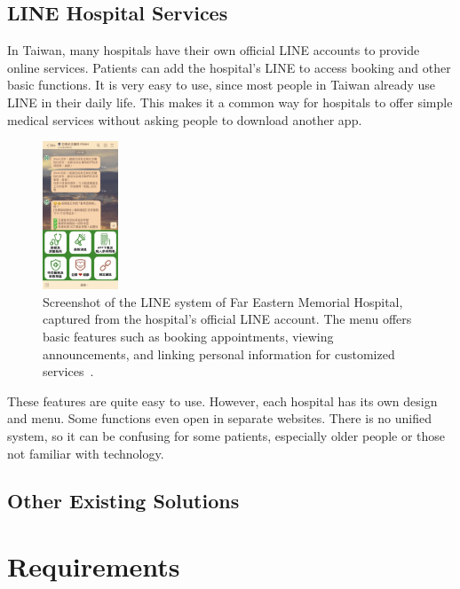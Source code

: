 \subsection{LINE Hospital Services}
In Taiwan, many hospitals have their own official LINE accounts to provide online services. Patients can add the hospital’s LINE to access booking and other basic functions. It is very easy to use, since most people in Taiwan already use LINE in their daily life. This makes it a common way for hospitals to offer simple medical services without asking people to download another app.

\begin{figure}[htbp]
    \centering
    \includegraphics[width=0.2\textwidth]{../../images/line.jpg}
    \caption{Screenshot of the LINE system of Far Eastern Memorial Hospital, captured from the hospital’s official LINE account. The menu offers basic features such as booking appointments, viewing announcements, and linking personal information for customized services~\cite{femhline}.}
    \label{fig:line-service}
\end{figure}

These features are quite easy to use. However, each hospital has its own design and menu. Some functions even open in separate websites. There is no unified system, so it can be confusing for some patients, especially older people or those not familiar with technology.


\subsection{Other Existing Solutions}

\clearpage  %


\clearpage
\section{Requirements}
\label{sec:requirements}

